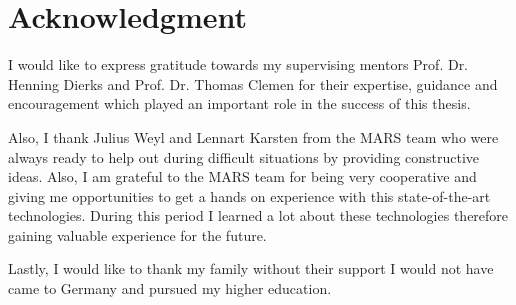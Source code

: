 \newpage
\thispagestyle{empty}
\section*{Acknowledgment}
I would like to express gratitude towards my supervising mentors Prof. Dr. Henning Dierks and Prof. Dr. Thomas Clemen for their expertise, guidance and 
encouragement which played an important role in the success of this thesis. 

Also, I thank Julius Weyl and Lennart Karsten from the MARS team who were always ready to help out during difficult situations by providing constructive
ideas. Also, I am grateful to the MARS team for being very cooperative and giving me opportunities to get a hands on experience with this state-of-the-art technologies.
During this period I learned a lot about these technologies therefore
gaining valuable experience for the future.

Lastly, I would like to thank my family without their support I would not have came to Germany and pursued my higher education.

